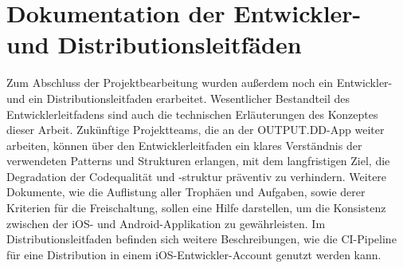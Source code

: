 \section{Dokumentation der Entwickler- und Distributionsleitfäden}

Zum Abschluss der Projektbearbeitung wurden außerdem noch ein Entwickler- und ein Distributionsleitfaden erarbeitet. Wesentlicher Bestandteil des Entwicklerleitfadens sind auch die technischen Erläuterungen des Konzeptes dieser Arbeit. Zukünftige Projektteams, die an der OUTPUT.DD-App weiter arbeiten, können über den Entwicklerleitfaden ein klares Verständnis der verwendeten Patterns und Strukturen erlangen, mit dem langfristigen Ziel, die Degradation der Codequalität und -struktur präventiv zu verhindern. Weitere Dokumente, wie die Auflistung aller Trophäen und Aufgaben, sowie derer Kriterien für die Freischaltung, sollen eine Hilfe darstellen, um die Konsistenz zwischen der iOS- und Android-Applikation zu gewährleisten. Im Distributionsleitfaden befinden sich weitere Beschreibungen, wie die CI-Pipeline für eine Distribution in einem iOS-Entwickler-Account genutzt werden kann.
